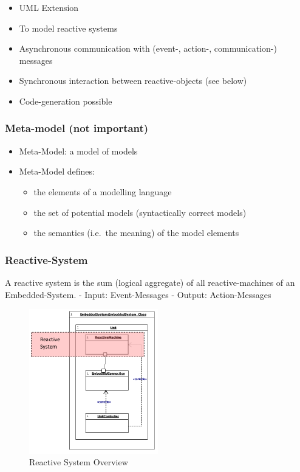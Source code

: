 \begin{itemize}
\tightlist
\item
  UML Extension
\item
  To model reactive systems
\item
  Asynchronous communication with (event-, action-, communication-)
  messages
\item
  Synchronous interaction between reactive-objects (see below)
\item
  Code-generation possible
\end{itemize}

\hypertarget{meta-model-not-important}{%
\subsubsection{Meta-model (not
important)}\label{meta-model-not-important}}

\begin{itemize}
\tightlist
\item
  Meta-Model: a model of models
\item
  Meta-Model defines:

  \begin{itemize}
  \tightlist
  \item
    the elements of a modelling language
  \item
    the set of potential models (syntactically correct models)
  \item
    the semantics (i.e.~the meaning) of the model elements
  \end{itemize}
\end{itemize}

\clearpage
\hypertarget{reactive-system}{%
\subsubsection{Reactive-System}\label{reactive-system}}

A reactive system is the sum (logical aggregate) of all
reactive-machines of an Embedded-System. - Input: Event-Messages -
Output: Action-Messages

\begin{figure}[H]
\centering
\includegraphics[width=0.5\textwidth]{figures/reactiveSystemOverview.png}
\caption{Reactive System Overview}
\end{figure}

